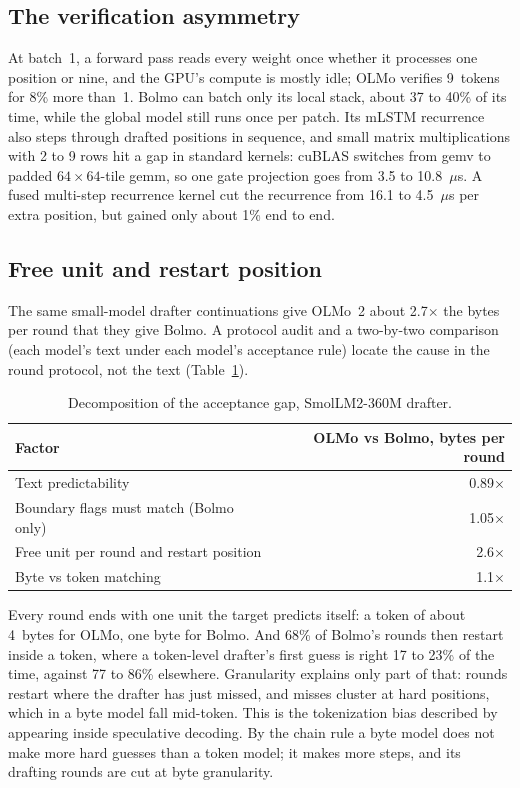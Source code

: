 \documentclass[11pt,a4paper]{article}
\newcommand{\x}{\ensuremath{\times}}
\begin{document}
\subsection{The verification asymmetry}

At batch~1, a forward pass reads every weight once whether it processes one position or nine, and the GPU's compute is mostly idle; OLMo verifies 9~tokens for 8\% more than~1. Bolmo can batch only its local stack, about 37 to 40\% of its time, while the global model still runs once per patch. Its mLSTM recurrence also steps through drafted positions in sequence, and small matrix multiplications with 2 to 9 rows hit a gap in standard kernels: cuBLAS switches from gemv to padded $64\times64$-tile gemm, so one gate projection goes from 3.5 to 10.8~$\mu$s. A fused multi-step recurrence kernel cut the recurrence from 16.1 to 4.5~$\mu$s per extra position, but gained only about 1\% end to end.

\subsection{Free unit and restart position}

The same small-model drafter continuations give OLMo~2 about 2.7\x{} the bytes per round that they give Bolmo. A protocol audit and a two-by-two comparison (each model's text under each model's acceptance rule) locate the cause in the round protocol, not the text (Table~\ref{tab:factors}).

\begin{table}[htbp]
\centering
\caption{Decomposition of the acceptance gap, SmolLM2-360M drafter.}
\label{tab:factors}
\begin{tabular}{lr}
\toprule
Factor & OLMo vs Bolmo, bytes per round \\
\midrule
Text predictability & 0.89\x \\
Boundary flags must match (Bolmo only) & 1.05\x \\
Free unit per round and restart position & 2.6\x \\
Byte vs token matching & 1.1\x \\
\bottomrule
\end{tabular}
\end{table}

Every round ends with one unit the target predicts itself: a token of about 4~bytes for OLMo, one byte for Bolmo. And 68\% of Bolmo's rounds then restart inside a token, where a token-level drafter's first guess is right 17 to 23\% of the time, against 77 to 86\% elsewhere. Granularity explains only part of that: rounds restart where the drafter has just missed, and misses cluster at hard positions, which in a byte model fall mid-token. This is the tokenization bias described by \citet{phan2025exact} appearing inside speculative decoding. By the chain rule a byte model does not make more hard guesses than a token model; it makes more steps, and its drafting rounds are cut at byte granularity.
\end{document}
